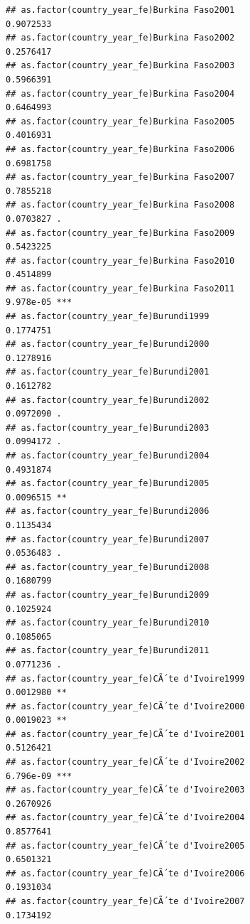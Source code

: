 \documentclass[
  a4paper,
]{article}
\begin{document}
\begin{verbatim}
## as.factor(country_year_fe)Burkina Faso2001                     0.9072533    
## as.factor(country_year_fe)Burkina Faso2002                     0.2576417    
## as.factor(country_year_fe)Burkina Faso2003                     0.5966391    
## as.factor(country_year_fe)Burkina Faso2004                     0.6464993    
## as.factor(country_year_fe)Burkina Faso2005                     0.4016931    
## as.factor(country_year_fe)Burkina Faso2006                     0.6981758    
## as.factor(country_year_fe)Burkina Faso2007                     0.7855218    
## as.factor(country_year_fe)Burkina Faso2008                     0.0703827 .  
## as.factor(country_year_fe)Burkina Faso2009                     0.5423225    
## as.factor(country_year_fe)Burkina Faso2010                     0.4514899    
## as.factor(country_year_fe)Burkina Faso2011                     9.978e-05 ***
## as.factor(country_year_fe)Burundi1999                          0.1774751    
## as.factor(country_year_fe)Burundi2000                          0.1278916    
## as.factor(country_year_fe)Burundi2001                          0.1612782    
## as.factor(country_year_fe)Burundi2002                          0.0972090 .  
## as.factor(country_year_fe)Burundi2003                          0.0994172 .  
## as.factor(country_year_fe)Burundi2004                          0.4931874    
## as.factor(country_year_fe)Burundi2005                          0.0096515 ** 
## as.factor(country_year_fe)Burundi2006                          0.1135434    
## as.factor(country_year_fe)Burundi2007                          0.0536483 .  
## as.factor(country_year_fe)Burundi2008                          0.1680799    
## as.factor(country_year_fe)Burundi2009                          0.1025924    
## as.factor(country_year_fe)Burundi2010                          0.1085065    
## as.factor(country_year_fe)Burundi2011                          0.0771236 .  
## as.factor(country_year_fe)CÃ´te d'Ivoire1999                   0.0012980 ** 
## as.factor(country_year_fe)CÃ´te d'Ivoire2000                   0.0019023 ** 
## as.factor(country_year_fe)CÃ´te d'Ivoire2001                   0.5126421    
## as.factor(country_year_fe)CÃ´te d'Ivoire2002                   6.796e-09 ***
## as.factor(country_year_fe)CÃ´te d'Ivoire2003                   0.2670926    
## as.factor(country_year_fe)CÃ´te d'Ivoire2004                   0.8577641    
## as.factor(country_year_fe)CÃ´te d'Ivoire2005                   0.6501321    
## as.factor(country_year_fe)CÃ´te d'Ivoire2006                   0.1931034    
## as.factor(country_year_fe)CÃ´te d'Ivoire2007                   0.1734192    

\end{verbatim}
\end{document}
